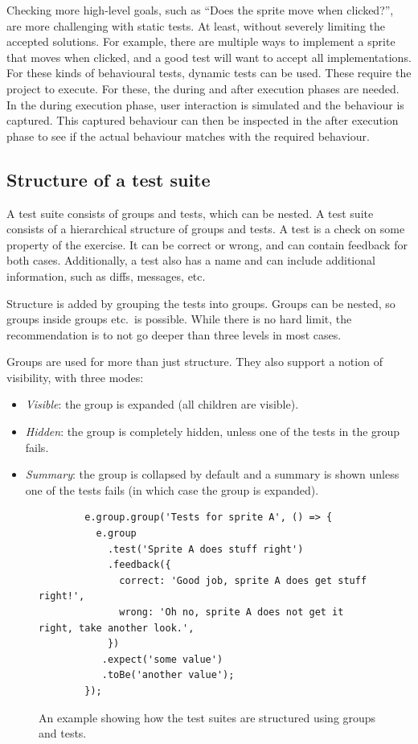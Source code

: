 \documentclass[../main]{subfiles}
\begin{document}
Checking more high-level goals, such as ``Does the sprite move when clicked?'', are more challenging with static tests.
At least, without severely limiting the accepted solutions.
For example, there are multiple ways to implement a sprite that moves when clicked, and a good test will want to accept all implementations.
For these kinds of behavioural tests, dynamic tests can be used.
These require the project to execute.
For these, the during and after execution phases are needed.
In the during execution phase, user interaction is simulated and the behaviour is captured.
This captured behaviour can then be inspected in the after execution phase to see if the actual behaviour matches with the required behaviour.

\subsection{Structure of a test suite}\label{subsec:structure-of-a-test-suite2}

A test suite consists of groups and tests, which can be nested.
A test suite consists of a hierarchical structure of groups and tests.
A test is a check on some property of the exercise.
It can be correct or wrong, and can contain feedback for both cases.
Additionally, a test also has a name and can include additional information, such as diffs, messages, etc.

Structure is added by grouping the tests into groups.
Groups can be nested, so groups inside groups etc.\ is possible.
While there is no hard limit, the recommendation is to not go deeper than three levels in most cases.

Groups are used for more than just structure.
They also support a notion of visibility, with three modes:

\begin{itemize}
    \item \emph{Visible}: the group is expanded (all children are visible).
    \item \emph{Hidden}: the group is completely hidden, unless one of the tests in the group fails.
    \item \emph{Summary}: the group is collapsed by default and a summary is shown unless one of the tests fails (in which case the group is expanded).
\end{itemize}

\begin{figure}
    \centering
    \begin{verbatim}
        e.group.group('Tests for sprite A', () => {
          e.group
            .test('Sprite A does stuff right')
            .feedback({
              correct: 'Good job, sprite A does get stuff right!',
              wrong: 'Oh no, sprite A does not get it right, take another look.',
            })
           .expect('some value')
           .toBe('another value');
        });
    \end{verbatim}
    \caption{An example showing how the test suites are structured using groups and tests.}\label{fig:itch-test-suite-structure}
\end{figure}
\end{document}
